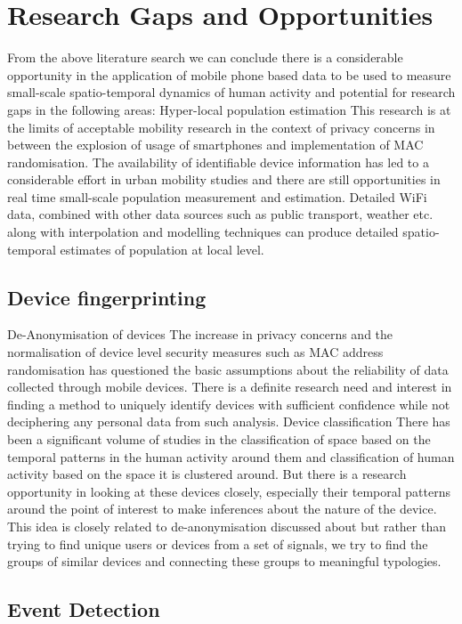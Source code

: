 \section{Research Gaps and Opportunities}

From the above literature search we can conclude there is a considerable opportunity in the application of mobile phone based data to be used to measure small-scale spatio-temporal dynamics of human activity and potential for research gaps in the following areas:
Hyper-local population estimation This research is at the limits of acceptable mobility research in the context of privacy concerns in between the explosion of usage of smartphones and implementation of MAC randomisation.
The availability of identifiable device information has led to a considerable effort in urban mobility studies and there are still opportunities in real time small-scale population measurement and estimation.
Detailed WiFi data, combined with other data sources such as public transport, weather etc.
along with interpolation and modelling techniques can produce detailed spatio-temporal estimates of population at local level.

\subsection{Device fingerprinting}
De-Anonymisation of devices The increase in privacy concerns and the normalisation of device level security measures such as MAC address randomisation has questioned the basic assumptions about the reliability of data collected through mobile devices.
There is a definite research need and interest in finding a method to uniquely identify devices with sufficient confidence while not deciphering any personal data from such analysis.
Device classification There has been a significant volume of studies in the classification of space based on the temporal patterns in the human activity around them and classification of human activity based on the space it is clustered around.
But there is a research opportunity in looking at these devices closely, especially their temporal patterns around the point of interest to make inferences about the nature of the device.
This idea is closely related to de-anonymisation discussed about but rather than trying to find unique users or devices from a set of signals, we try to find the groups of similar devices and connecting these groups to meaningful typologies.

\subsection{Event Detection}



